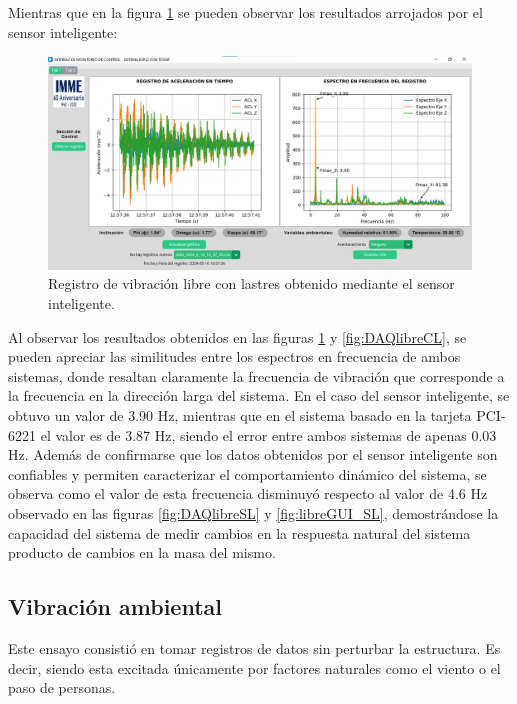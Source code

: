 Mientras que en la figura \ref{fig:libreGUI_CL} se pueden observar los resultados arrojados por el sensor inteligente:

\begin{figure}[H]
    \centering
    \includegraphics[width = \textwidth]{imagenes/cap3_resultados/Ensayos/VibLibreLastresSMARTSENSOR.jpg}
    \caption{Registro de vibración libre con lastres obtenido mediante el sensor inteligente.}
    \label{fig:libreGUI_CL}
\end{figure}

Al observar los resultados obtenidos en las figuras \ref{fig:libreGUI_CL} y \ref{fig:DAQlibreCL}, se pueden apreciar las similitudes entre los espectros en frecuencia de ambos sistemas, donde resaltan claramente la frecuencia de vibración que corresponde a la frecuencia en la dirección larga del sistema. En el caso del sensor inteligente, se obtuvo un valor de 3.90 Hz, mientras que en el sistema basado en la tarjeta PCI-6221 el valor es de 3.87 Hz, siendo el error entre ambos sistemas de apenas 0.03 Hz. Además de confirmarse que los datos obtenidos por el sensor inteligente son confiables y permiten caracterizar el comportamiento dinámico del sistema, se observa como el valor de esta frecuencia disminuyó respecto al valor de 4.6 Hz observado en las figuras \ref{fig:DAQlibreSL} y \ref{fig:libreGUI_SL}, demostrándose la capacidad del sistema de medir cambios en la respuesta natural del sistema producto de cambios en la masa del mismo.

\subsection{Vibración ambiental}

Este ensayo consistió en tomar registros de datos sin perturbar la estructura. Es decir, siendo esta excitada únicamente por factores naturales como el viento o el paso de personas.

